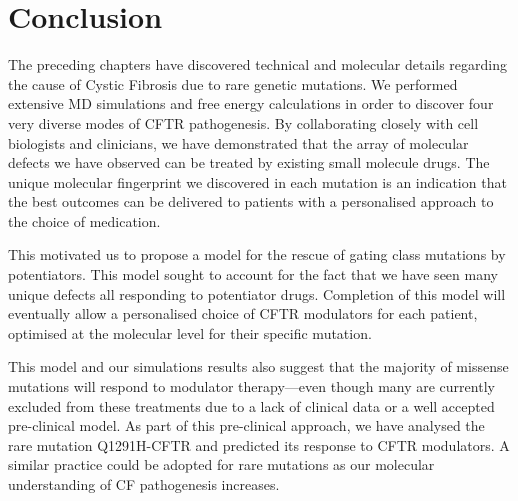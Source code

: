 


\section{Conclusion}
The preceding chapters have discovered technical and molecular details regarding the cause of Cystic Fibrosis due to rare genetic mutations. We performed extensive MD simulations and free energy calculations in order to discover four very diverse modes of CFTR pathogenesis. By collaborating closely with cell biologists and clinicians, we have demonstrated that the array of molecular defects we have observed can be treated by existing small molecule drugs. The unique molecular fingerprint we discovered in each mutation is an indication that the best outcomes can be delivered to patients with a personalised approach to the choice of medication. 

This motivated us to propose a model for the rescue of gating class mutations by potentiators. This model sought to account for the fact that we have seen many unique defects all responding to potentiator drugs. Completion of this model will eventually allow a personalised choice of CFTR modulators for each patient, optimised at the molecular level for their specific mutation.

This model and our simulations results also suggest that the majority of missense mutations will respond to modulator therapy---even though many are currently excluded from these treatments due to a lack of clinical data or a well accepted pre-clinical model. As part of this pre-clinical approach, we have analysed the rare mutation Q1291H-CFTR and predicted its response to CFTR modulators. A similar practice could be adopted for rare mutations as our molecular understanding of CF pathogenesis increases. 

